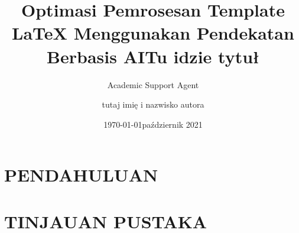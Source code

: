 \documentclass{article}
\title{Optimasi Pemrosesan Template LaTeX Menggunakan Pendekatan Berbasis AI}
\author{Academic Support Agent}
\date{\today}
\begin{document}
\maketitle

\begin{abstract}

\end{abstract}

\chapter{PENDAHULUAN}


\chapter{TINJAUAN PUSTAKA}


\title{Tu idzie tytuł}
\author{tutaj imię i nazwisko autora}
\date{\footnotesize październik 2021}


\usepackage{mathtools,amsthm}    %
\usepackage{graphicx}            %
\usepackage{microtype}           %
\usepackage{booktabs}            %
\usepackage{multicol}            %
\usepackage{pifont}
\usepackage[framemethod=tikz]{mdframed}
\usepackage{tcolorbox}
\usepackage{minted}
\usepackage{fancyhdr}
\usepackage[T1]{fontenc}
\usepackage{polski}
\usepackage[numbers]{natbib}
\usepackage{wallpaper}


\pagestyle{fancy}
\fancyhf{}


\newcommand\term[1]{`#1'}
\newcommand\pkg[1]{\textsf{#1}}
\newcommand\writeLaTeX{{\sffamily Overleaf}}
\end{document}
